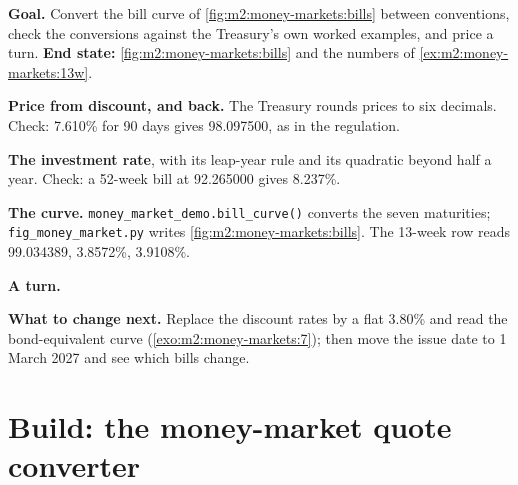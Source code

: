 \begin{tutorial}
\textbf{Goal.} Convert the bill curve of \cref{fig:m2:money-markets:bills}
between conventions, check the conversions against the Treasury's own worked
examples, and price a turn. \textbf{End state:}
\cref{fig:m2:money-markets:bills} and the numbers of
\cref{ex:m2:money-markets:13w}.
\begin{tutsteps}
\item \textbf{Price from discount, and back.} The Treasury rounds prices to six
decimals.
\label{lst:m2:money-markets:price}
Check: 7.610\% for 90 days gives 98.097500, as in the regulation.
\item \textbf{The investment rate}, with its leap-year rule and its quadratic
beyond half a year.
\label{lst:m2:money-markets:bey}
Check: a 52-week bill at 92.265000 gives 8.237\%.
\item \textbf{The curve.} \texttt{money\_market\_demo.bill\_curve()} converts
the seven maturities; \texttt{fig\_money\_market.py} writes
\cref{fig:m2:money-markets:bills}. The 13-week row reads 99.034389,
3.8572\%, 3.9108\%.
\item \textbf{A turn.}
\label{lst:m2:money-markets:turn}
\end{tutsteps}
\textbf{What to change next.} Replace the discount rates by a flat 3.80\% and
read the bond-equivalent curve (\cref{exo:m2:money-markets:7}); then move the
issue date to 1 March 2027 and see which bills change.
\end{tutorial}

\section{Build: the money-market quote converter}\label{bld:m2:money-markets:mmyield}

